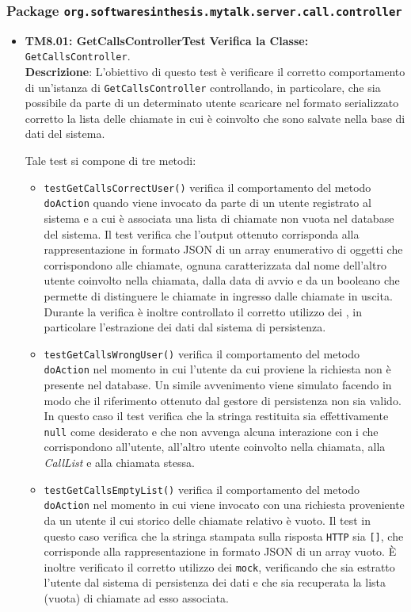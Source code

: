\subsubsection{Package \texttt{org.softwaresinthesis.mytalk.server.call.controller}}
\begin{itemize}

\item \textbf{TM8.01: GetCallsControllerTest} 
\textbf{Verifica la Classe:} \texttt{GetCallsController}.\\
\textbf{Descrizione}: L'obiettivo di questo test è verificare il corretto comportamento di un'istanza di \texttt{GetCallsController} controllando, in particolare, che sia possibile da parte di un determinato utente scaricare nel formato serializzato corretto la lista delle chiamate in cui è coinvolto che sono salvate nella base di dati del sistema.

Tale test si compone di tre metodi:
\begin{itemize}
\item \texttt{testGetCallsCorrectUser()} verifica il comportamento del metodo \texttt{doAction} quando viene invocato da parte di un utente registrato al sistema e a cui è associata una lista di chiamate non vuota nel database del sistema. Il test verifica che l'output ottenuto corrisponda alla rappresentazione in formato JSON di un array enumerativo di oggetti che corrispondono alle chiamate, ognuna caratterizzata dal nome dell'altro utente coinvolto nella chiamata, dalla data di avvio e da un  booleano che permette di distinguere le chiamate in ingresso dalle chiamate in uscita. Durante la verifica è inoltre controllato il corretto utilizzo dei , in particolare l'estrazione dei dati dal sistema di persistenza.

\item \texttt{testGetCallsWrongUser()} verifica il comportamento del metodo \texttt{doAction} nel momento in cui l'utente da cui proviene la richiesta non è presente nel database. Un simile avvenimento viene simulato facendo in modo che il riferimento ottenuto dal gestore di persistenza non sia valido. In questo caso il test verifica che la stringa restituita sia effettivamente \texttt{null} come desiderato e che non avvenga alcuna interazione con i  che corrispondono all'utente, all'altro utente coinvolto nella chiamata, alla \textit{CallList} e alla chiamata stessa.

\item \texttt{testGetCallsEmptyList()} verifica il comportamento del metodo \texttt{doAction} nel momento in cui viene invocato con una richiesta proveniente da un utente il cui storico delle chiamate relativo è vuoto. Il test in questo caso verifica che la stringa stampata sulla risposta \texttt{HTTP} sia \texttt{[]}, che corrisponde alla rappresentazione in formato JSON di un array vuoto. È inoltre verificato il corretto utilizzo dei \texttt{mock}, verificando che sia estratto l'utente dal sistema di persistenza dei dati e che sia recuperata la lista (vuota) di chiamate ad esso associata.


\end{itemize}
\end{itemize}
